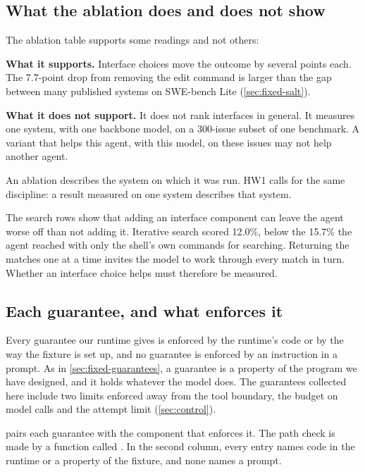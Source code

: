 \subsection{What the ablation does and does not show}
\label{sec:boundary-ablation-limits}

The ablation table supports some readings and not others:
\bi
\item \textbf{What it supports.} Interface choices move the outcome by several points each. The
7.7-point drop from removing the edit command is larger than the gap between many published systems
on SWE-bench Lite (\cref{sec:fixed-salt}).
\item \textbf{What it does not support.} It does not rank interfaces in general. It measures one
system, with one backbone model, on a 300-issue subset of one benchmark. A variant that helps this
agent, with this model, on these issues may not help another agent.
\ei

An ablation describes the system on which it was run. HW1 calls for the same discipline: a result
measured on one system describes that system.

The search rows show that adding an interface component can leave the agent worse off than not
adding it. Iterative search scored 12.0\%, below the 15.7\% the agent reached with only the shell's
own commands for searching.
Returning the matches one at a time invites the model to work through every match in turn. Whether
an interface choice helps must therefore be measured.

\subsection{Each guarantee, and what enforces it}
\label{sec:boundary-guarantees}

Every guarantee our runtime gives is enforced by the runtime's code or by the way the fixture is set
up, and no guarantee is enforced by an instruction in a prompt. As in \cref{sec:fixed-guarantees}, a
guarantee is a property of the program we have designed, and it holds whatever the model does. The
guarantees collected here include two limits enforced away from the tool boundary, the budget on
model calls and the attempt limit (\cref{sec:control}).

 pairs each guarantee with the component that enforces it. The path
check is made by a function called . In the second column, every entry
names code in the runtime or a property of the fixture, and none names a prompt.

